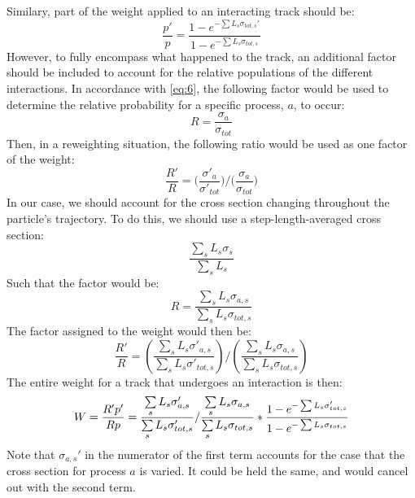 \documentclass[12pt]{article}
\begin{document}
Similary, part of the weight applied to an interacting track should be:
\begin{equation}\label{eq:10}
\frac{p'}{p} = \frac{1 - e^{-\sum L_s  \sigma_{tot,s}'}}{1 - e^{-\sum L_s  \sigma_{tot,s}}}
\end{equation}
However, to fully encompass what happened to the track, an additional factor should be included to account for the relative populations of the different interactions. In accordance with \ref{eq:6}, the following factor would be used to determine the relative probability for a specific process, $a$, to occur:
\begin{equation}
R = \frac{\sigma_a}{\sigma_{tot}}
\end{equation}
Then, in a reweighting situation, the following ratio would be used as one factor of the weight:
\begin{equation}
\frac{R'}{R} = \big(\frac{\sigma'_a}{\sigma'_{tot}}\big)/\big(\frac{\sigma_a}{\sigma_{tot}}\big)
\end{equation}
In our case, we should account for the cross section changing throughout the particle's trajectory. To do this, we should use a step-length-averaged cross section:
\begin{equation}
\frac{\sum \limits_{s} L_s \sigma_s}{\sum \limits_{s} L_s}
\end{equation}
Such that the factor would be:
\begin{equation}
R = \frac{ \sum	\limits_{s} L_s \sigma_{a,s}}{\sum	\limits_{s} L_s \sigma_{tot,s}}
\end{equation}
The factor assigned to the weight would then be:
\begin{equation}\label{eq:16}
\frac{R'}{R} = (\frac{ \sum	\limits_{s} L_s \sigma'_{a,s}}{\sum	\limits_{s} L_s \sigma'_{tot,s}})/(\frac{ \sum	\limits_{s} L_s \sigma_{a,s}}{\sum	\limits_{s} L_s \sigma_{tot,s}})
\end{equation}
The entire weight for a track that undergoes an interaction is then:
\begin{equation} \label{eq:17}
W = \frac{R'p'}{Rp}\\
= \frac{ \sum	\limits_{s} L_s \sigma'_{a,s}}{\sum	\limits_{s} L_s \sigma'_{tot,s}} / \frac{ \sum	\limits_{s} L_s \sigma_{a,s}}{\sum	\limits_{s} L_s \sigma_{tot,s}} * \frac{1 - e^{-\sum L_s  \sigma_{tot,s}'}}{1 - e^{-\sum L_s  \sigma_{tot,s}}}
\end{equation}
Note that $\sigma_{a,s}'$ in the numerator of the first term accounts for the case that the cross section for process $a$ is varied. It could be held the same, and would cancel out with the second term. 
\end{document}
